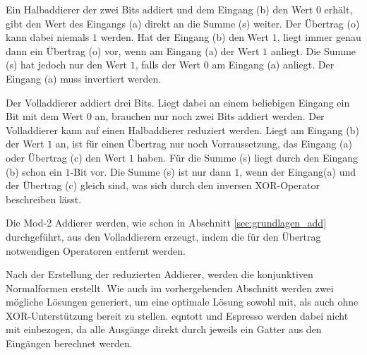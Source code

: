 Ein Halbaddierer der zwei Bits addiert und dem Eingang (b) den Wert $0$ erhält, gibt den Wert des Eingangs (a) direkt an die Summe (s) weiter.
Der Übertrag (o) kann dabei niemals $1$ werden. Hat der Eingang (b) den Wert $1$, liegt immer genau dann ein Übertrag (o) vor, wenn am Eingang (a)
der Wert $1$ anliegt. Die Summe (s) hat jedoch nur den Wert $1$, falls der Wert $0$ am Eingang (a) anliegt. Der Eingang (a) muss invertiert werden.

Der Volladdierer addiert drei Bits. Liegt dabei an einem beliebigen Eingang ein Bit mit dem Wert $0$ an, brauchen nur noch zwei Bits addiert werden.
Der Volladdierer kann auf einen Halbaddierer reduziert werden. Liegt am Eingang (b) der Wert $1$ an, ist für einen Übertrag nur noch Vorraussetzung,
das Eingang (a) oder Übertrag (c) den Wert $1$ haben. Für die Summe (s) liegt durch den Eingang (b) schon ein $1$-Bit vor. Die Summe (s) ist nur dann
$1$, wenn der Eingang(a) und der Übertrag (c) gleich sind, was sich durch den inversen XOR-Operator beschreiben lässt.

Die Mod-2 Addierer werden, wie schon in Abschnitt \ref{sec:grundlagen_add} durchgeführt, aus den Volladdierern erzeugt, indem die für den Übertrag
notwendigen Operatoren entfernt werden.

Nach der Erstellung der reduzierten Addierer, werden die konjunktiven Normalformen erstellt. Wie auch im vorhergehenden Abschnitt werden zwei mögliche
Lösungen generiert, um eine optimale Lösung sowohl mit, als auch ohne XOR-Unterstützung bereit zu stellen. eqntott und Espresso werden dabei nicht mit
einbezogen, da alle Ausgänge direkt durch jeweils ein Gatter aus den Eingängen berechnet werden. 


